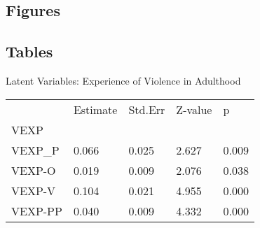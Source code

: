 \documentclass[utf8]{article}
\begin{document}

\subsection{Figures}


\subsection{Tables}

Latent Variables: Experience of Violence in Adulthood
\begin{table}[]
\begin{tabular}{lllll}
        & Estimate & Std.Err & Z-value & p     \\
VEXP    &          &         &         &       \\
VEXP\_P & 0.066    & 0.025   & 2.627   & 0.009 \\
VEXP-O  & 0.019    & 0.009   & 2.076   & 0.038 \\
VEXP-V  & 0.104    & 0.021   & 4.955   & 0.000 \\
VEXP-PP & 0.040    & 0.009   & 4.332   & 0.000
\end{tabular}
\end{table}
\end{document}
